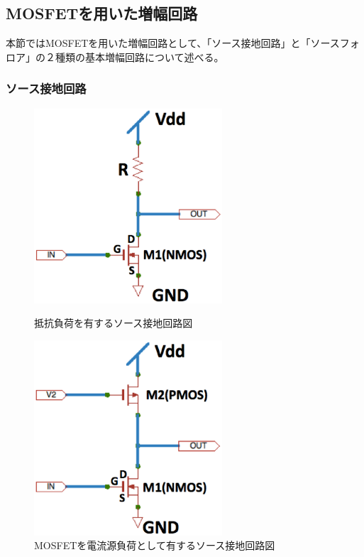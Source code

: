 	\subsection{MOSFETを用いた増幅回路}
		本節ではMOSFETを用いた増幅回路として、「ソース接地回路」と「ソースフォロア」の２種類の基本増幅回路について述べる。
		\subsubsection{ソース接地回路}
			\begin{figure}[htbp]
				 \begin{minipage}{0.5\hsize}
					\begin{center}
						\includegraphics[width=70mm]{./Chapter/Chapter3/Picture/MOSFET_CommonSource_1.eps}
					\end{center}
					\caption{抵抗負荷を有するソース接地回路図}
					\label{fig:MOSFET_CommonSource_1}
				\end{minipage}
				\begin{minipage}{0.5\hsize}
					\begin{center}
						\includegraphics[width=70mm]{./Chapter/Chapter3/Picture/MOSFET_CommonSource_2.eps}
					\end{center}
					\caption{MOSFETを電流源負荷として有するソース接地回路図}
					\label{fig:MOSFET_CommonSource_2}
				\end{minipage}
			\end{figure}	
